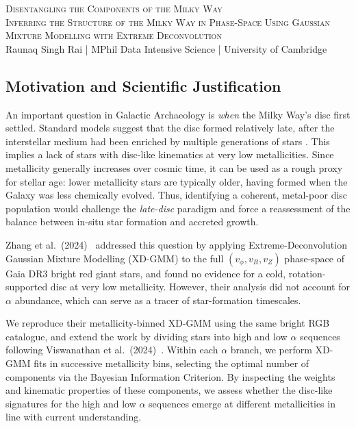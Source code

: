 \documentclass[a4paper,10pt]{article}
\begin{document}
\begin{center}
    {\Large \textsc{Disentangling the Components of the Milky Way}}\\[0.2cm]
    {\textsc{Inferring the Structure of the Milky Way in Phase-Space Using Gaussian Mixture Modelling with Extreme Deconvolution}}\\[0.2cm]
    Raunaq Singh Rai \quad | \quad MPhil Data Intensive Science \quad | \quad University of Cambridge
\end{center}

\begin{multicols}{2}

\section*{Motivation and Scientific Justification}

An important question in Galactic Archaeology is \emph{when} the Milky Way’s disc first settled.  
Standard models suggest that the disc formed relatively late, after the interstellar medium had been enriched by multiple generations of stars \cite{Sestito2020} \cite{Gurvich2023}. 
This implies a lack of stars with disc-like kinematics at very low metallicities. 
Since metallicity generally increases over cosmic time, it can be used as a rough proxy for stellar age: lower metallicity stars are typically older, having formed when the Galaxy was less chemically evolved. 
Thus, identifying a coherent, metal-poor disc population would challenge the \emph{late-disc} paradigm and force a reassessment of the balance between in-situ star formation and accreted growth.

Zhang et al.\ (2024)~\cite{zhang2024existencemetalpoordiscmilky} addressed this question by applying Extreme-Deconvolution Gaussian Mixture Modelling (XD-GMM) to the full $(v_{\phi},v_{R},v_{Z})$ phase-space of 
Gaia DR3 bright red giant stars, and found no evidence for a cold, rotation-supported disc at very low metallicity. However, their analysis did not account for $\alpha$ abundance, which can serve as a tracer of star-formation timescales.

We reproduce their metallicity-binned XD-GMM using the same bright RGB catalogue, and extend the work by dividing stars into high and low $\alpha$ sequences following Viswanathan et al.\ (2024)~\cite{Vis2024}.  
Within each $\alpha$ branch, we perform XD-GMM fits in successive metallicity bins, selecting the optimal number of components via the Bayesian Information Criterion.  
By inspecting the weights and kinematic properties of these components, we assess whether the disc-like signatures for the high and low $\alpha$ sequences emerge at different metallicities in line with current understanding.



\end{multicols}
\end{document}
